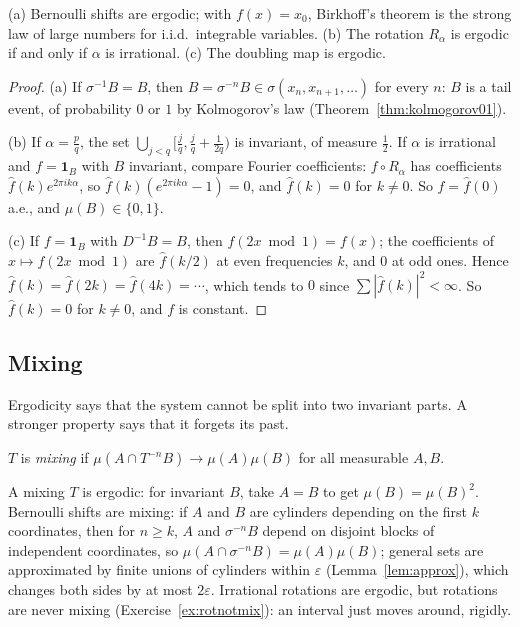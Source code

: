 \begin{corollary}\label{cor:ergexamples}
(a) Bernoulli shifts are ergodic; with $f(x)=x_0$, Birkhoff's theorem is the strong law of large numbers for i.i.d.\ integrable variables.
(b) The rotation $R_\alpha$ is ergodic if and only if $\alpha$ is irrational.
(c) The doubling map is ergodic.
\end{corollary}
\begin{proof}
(a) If $\sigma^{-1}B=B$, then $B=\sigma^{-n}B\in\sigma(x_n,x_{n+1},\dots)$ for every $n$: $B$ is a tail event, of probability $0$ or $1$ by Kolmogorov's law (Theorem~\ref{thm:kolmogorov01}).

(b) If $\alpha=\frac pq$, the set $\bigcup_{j<q}[\frac jq,\frac jq+\frac1{2q})$ is invariant, of measure $\frac12$. If $\alpha$ is irrational and $f=\mathbf 1_B$ with $B$ invariant, compare Fourier coefficients: $f\circ R_\alpha$ has
coefficients $\hat f(k)e^{2\pi ik\alpha}$, so $\hat f(k)(e^{2\pi ik\alpha}-1)=0$, and $\hat f(k)=0$ for $k\neq0$. So $f=\hat f(0)$ a.e., and $\mu(B)\in\{0,1\}$.

(c) If $f=\mathbf 1_B$ with $D^{-1}B=B$, then $f(2x\bmod1)=f(x)$; the coefficients of $x\mapsto f(2x\bmod1)$ are $\hat f(k/2)$ at even frequencies $k$, and $0$ at odd ones. Hence $\hat f(k)=\hat f(2k)=\hat f(4k)=\cdots$, which tends to $0$
since $\sum|\hat f(k)|^2<\infty$. So $\hat f(k)=0$ for $k\neq0$, and $f$ is constant.
\end{proof}

\subsection*{Mixing}

Ergodicity says that the system cannot be split into two invariant parts. A stronger property says that it forgets its past.

\begin{definition}
$T$ is \emph{mixing} if $\mu(A\cap T^{-n}B)\to\mu(A)\mu(B)$ for all measurable $A,B$.
\end{definition}

A mixing $T$ is ergodic: for invariant $B$, take $A=B$ to get $\mu(B)=\mu(B)^2$. Bernoulli shifts are mixing: if $A$ and $B$ are cylinders depending on the first $k$ coordinates, then for $n\ge k$, $A$ and
$\sigma^{-n}B$ depend on disjoint blocks of independent coordinates, so $\mu(A\cap\sigma^{-n}B)=\mu(A)\mu(B)$; general sets are approximated by finite unions of cylinders within $\varepsilon$ (Lemma~\ref{lem:approx}), which
changes both sides by at most $2\varepsilon$. Irrational rotations are ergodic, but rotations are never mixing (Exercise~\ref{ex:rotnotmix}): an interval just moves around, rigidly.

